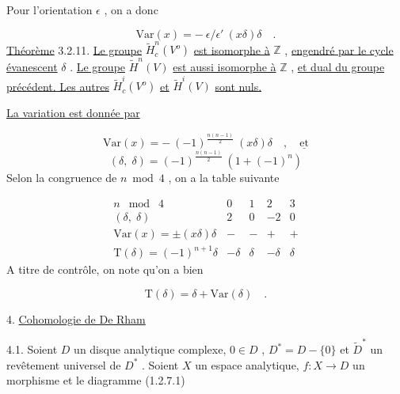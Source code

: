 Pour l'orientation $\epsilon$ , on a donc

\begin{equation*}
\mathrm{Var}(x) = -\ \epsilon/\epsilon'\ (x\delta)\delta \quad .
\end{equation*}
\underline{Théorème} 3.2.11. \underline{Le groupe} $\widetilde{H}^n_c(V^o)$ \underline{est isomorphe à} $\mathbb{Z}$ , \underline{engendré par le cycle évanescent} $\delta$ . \underline{Le groupe} $\widetilde{H}^n(V)$ \underline{est aussi isomorphe à} $\mathbb{Z}$ , \underline{et dual du groupe précédent. Les autres} $\widetilde{H}^i_c(V^o)$ \underline{et} $\widetilde{H}^i(V)$ \underline{sont nuls.}

\underline{La variation est donnée par}

\begin{equation*}
\mathrm{Var}(x) = -\ (-1)^{\frac{n(n-1)}{2}}\ (x\delta)\delta \quad , \quad \underline{\mbox{et}}
\end{equation*}
\begin{equation*}
(\delta, \; \delta) = (-1)^{\frac{n(n-1)}{2}}\ (1+(-1)^n)
\end{equation*}
Selon la congruence de $n \bmod 4$ , on a la table suivante

\begin{equation*}
\begin{array}{lcccc}
n \;\bmod\; 4 & 0 & 1 & 2 & 3 \\[2pt]
(\delta, \; \delta) & 2 & 0 & -2 & 0 \\[2pt]
\mathrm{Var}(x) = \pm(x\delta)\delta & - & - & + & + \\[2pt]
\mathrm{T}(\delta) = (-1)^{n+1}\delta & -\delta & \delta & -\delta & \delta
\end{array}
\end{equation*}
A titre de contrôle, on note qu'on a bien

\begin{equation*}
\mathrm{T}(\delta) = \delta + \mathrm{Var}(\delta) \quad .
\end{equation*}



4. \underline{Cohomologie de De Rham}

4.1.  Soient $D$ un disque analytique complexe, $0 \in D$ , $D^* = D - \{0\}$ et $\tilde{D}^*$ un revêtement universel de $D^*$ . Soient $X$ un espace analytique, $f : X \to D$ un morphisme et le diagramme (1.2.7.1)

